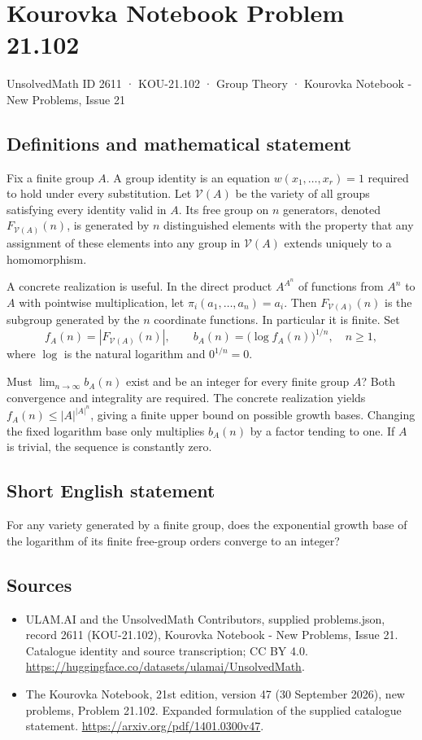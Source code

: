 \documentclass[11pt,a4paper]{article}
\begin{document}
\section*{Kourovka Notebook Problem 21.102}\label{2611}
{\small UnsolvedMath ID 2611 · KOU-21.102 · Group Theory · Kourovka Notebook - New Problems, Issue 21}
\subsection{Definitions and mathematical statement}
Fix a finite group $A$. A group identity is an equation $w(x_1,\ldots,x_r)=1$ required to hold under every substitution. Let $\mathcal V(A)$ be the variety of all groups satisfying every identity valid in $A$. Its free group on $n$ generators, denoted $F_{\mathcal V(A)}(n)$, is generated by $n$ distinguished elements with the property that any assignment of these elements into any group in $\mathcal V(A)$ extends uniquely to a homomorphism.

A concrete realization is useful. In the direct product $A^{A^n}$ of functions from $A^n$ to $A$ with pointwise multiplication, let $\pi_i(a_1,\ldots,a_n)=a_i$. Then $F_{\mathcal V(A)}(n)$ is the subgroup generated by the $n$ coordinate functions. In particular it is finite. Set
\[
 f_A(n)=|F_{\mathcal V(A)}(n)|,\qquad
 b_A(n)=\bigl(\log f_A(n)\bigr)^{1/n},\quad n\ge1,
\]
where $\log$ is the natural logarithm and $0^{1/n}=0$.

Must $\lim_{n\to\infty}b_A(n)$ exist and be an integer for every finite group $A$? Both convergence and integrality are required. The concrete realization yields $f_A(n)\le|A|^{|A|^n}$, giving a finite upper bound on possible growth bases. Changing the fixed logarithm base only multiplies $b_A(n)$ by a factor tending to one. If $A$ is trivial, the sequence is constantly zero.
\subsection{Short English statement}
For any variety generated by a finite group, does the exponential growth base of the logarithm of its finite free-group orders converge to an integer?
\subsection{Sources}
\begin{itemize}
\item[S1] ULAM.AI and the UnsolvedMath Contributors, supplied problems.json, record 2611 (KOU-21.102), Kourovka Notebook - New Problems, Issue 21. Catalogue identity and source transcription; CC BY 4.0.
\url{https://huggingface.co/datasets/ulamai/UnsolvedMath}.
\item[S2] The Kourovka Notebook, 21st edition, version 47 (30 September 2026), new problems, Problem 21.102. Expanded formulation of the supplied catalogue statement.
\url{https://arxiv.org/pdf/1401.0300v47}.
\end{itemize}
\end{document}
